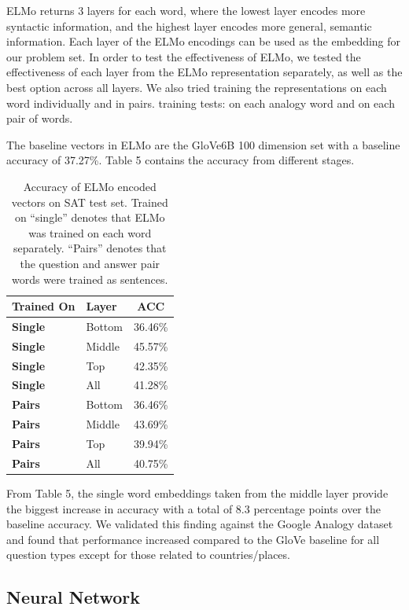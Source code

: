 \documentclass[11pt]{article}
\begin{document}
ELMo returns 3 layers for each word, where the lowest layer encodes more
syntactic information, and the highest layer encodes more general, semantic
information. Each layer of the ELMo encodings can be used as the embedding for
our problem set. In order to test the effectiveness of ELMo, we tested the
effectiveness of each layer from the ELMo representation separately, as well as
the best option across all layers. We also tried training the representations on
each word individually and in pairs. training tests: on each analogy word and on
each pair of words.

The baseline vectors in ELMo are the GloVe6B 100 dimension set with a baseline
accuracy of 37.27\%. Table 5 contains the accuracy from different stages.

\begin{table}[h]
\begin{center}
\begin{tabular}{|l|lc|}
\hline\bf Trained On & Layer & ACC \\\hline
\bf Single & Bottom & 36.46\% \\
\bf Single & Middle & 45.57\% \\
\bf Single & Top & 42.35\% \\
\bf Single & All & 41.28\% \\
\bf Pairs & Bottom & 36.46\% \\
\bf Pairs & Middle & 43.69\% \\
\bf Pairs & Top & 39.94\% \\
\bf Pairs & All & 40.75\% \\\hline
\end{tabular}
\end{center}
\caption{\label{font-table} Accuracy of ELMo encoded vectors on SAT test set. Trained on ``single'' denotes that ELMo was trained on each word separately. ``Pairs'' denotes that the question and answer pair words were trained as sentences.}
\end{table}

From Table 5, the single word embeddings taken from the middle layer provide the
biggest increase in accuracy with a total of 8.3 percentage points over the
baseline accuracy. We validated this finding against the Google Analogy dataset
and found that performance increased compared to the GloVe baseline for all
question types except for those related to countries/places.

\subsection{Neural Network}
\end{document}
